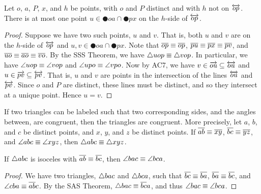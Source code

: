 \begin{prop}
Let \(o\), \(a\), \(P\), \(x\), and \(h\) be points, with \(o\) and \(P\) distinct and with \(h\) not on \(\overleftrightarrow{op}\).
There is at most one point \(u \in \CIRCLE{o}{a} \cap \CIRCLE{p}{x}\) on the \(h\)-side of \(\overleftrightarrow{op}\).
\end{prop}

\begin{proof}
Suppose we have two such points, \(u\) and \(v\).
That is, both \(u\) and \(v\) are on the \(h\)-side of \(\overleftrightarrow{op}\) and \(u,v \in \CIRCLE{o}{a} \cap \CIRCLE{p}{x}\).
Note that \(\overline{op} \equiv \overline{op}\), \(\overline{pu} \equiv \overline{px} \equiv \overline{pv}\), and \(\overline{uo} \equiv \overline{ao} \equiv \overline{vo}\).
By the SSS Theorem, we have \(\bigtriangleup{uop} \equiv \bigtriangleup{vop}\).
In particular, we have \(\angle{uop} \equiv \angle{vop}\) and \(\angle{upo} \equiv \angle{vpo}\).
Now by AC7, we have \(v \in \overrightarrow{ou} \subseteq \overleftrightarrow{ou}\) and \(u \in \overrightarrow{pv} \subseteq \overleftrightarrow{pv}\).
That is, \(u\) and \(v\) are points in the intersection of the lines \(\overleftrightarrow{ou}\) and \(\overleftrightarrow{pv}\).
Since \(o\) and \(P\) are distinct, these lines must be distinct, and so they intersect at a unique point.
Hence \(u = v\).
\end{proof}

\begin{prop}
If two triangles can be labeled such that two corresponding sides, and the angles between, are congruent, then the triangles are congruent.
More precisely, let \(a\), \(b\), and \(c\) be distinct points, and \(x\), \(y\), and \(z\) be distinct points.
If \(\overline{ab} \equiv \overline{xy}\), \(\overline{bc} \equiv \overline{yz}\), and \(\angle{abc} \equiv \angle{xyz}\), then \(\bigtriangleup{abc} \equiv \bigtriangleup{xyz}\).
\end{prop}

\begin{prop}
If \(\bigtriangleup{abc}\) is isoceles with \(\overline{ab} \equiv \overline{bc}\), then \(\angle{bac} \equiv \angle{bca}\).
\end{prop}

\begin{proof}
We have two triangles, \(\bigtriangleup{bac}\) and \(\bigtriangleup{bca}\), such that \(\overline{bc}\equiv \overline{ba}\), \(\overline{ba} \equiv \overline{bc}\), and \(\angle{cba} \equiv \overline{ab}{c}\).
By the SAS Theorem, \(\bigtriangleup{bac} \equiv \overline{bc}{a}\), and thus \(\angle{bac} \equiv \angle{bca}\).
\end{proof}

